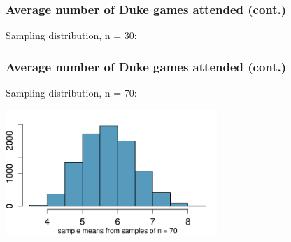 \documentclass[11pt,containsverbatim,handout,xcolor=xelatex,dvipsnames,table]{beamer}
\newcommand{\soln}[1]{}
\begin{document}

\begin{frame}[fragile]
\frametitle{Average number of Duke games attended (cont.)}

Sampling distribution, n = 30:

{
\soln{\only<2->{Shape is more symmetric, center is about the same, spread is smaller.}}
}

\note{



}

\end{frame}



\begin{frame}[fragile]
\frametitle{Average number of Duke games attended (cont.)}

Sampling distribution, n = 70:

\begin{center}
\includegraphics[width=0.6\textwidth]{figures/duke_games/hist_duke_games_sampling70}
\end{center}

\end{frame}
\end{document}
